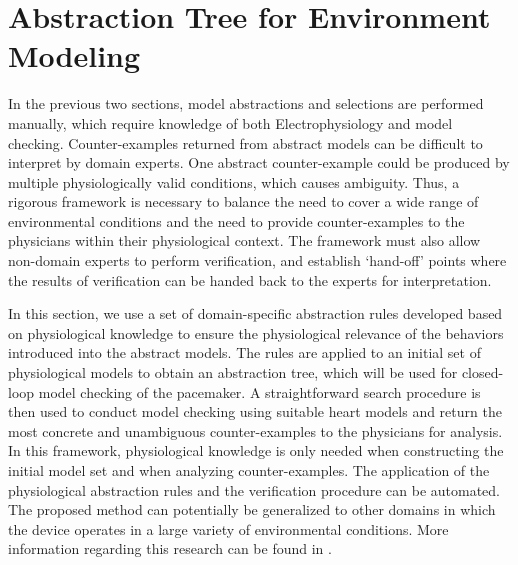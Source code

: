 \section{Abstraction Tree for Environment Modeling}
In the previous two sections, model abstractions and selections are performed manually, which require knowledge of both Electrophysiology and model checking. 
Counter-examples returned from abstract models can be difficult to interpret by domain experts.
One abstract counter-example could be produced by multiple physiologically valid conditions, which causes ambiguity.
Thus, a rigorous framework is necessary to balance the need to cover a wide range of environmental conditions and the need to provide counter-examples to the physicians within their physiological context. The framework must also allow non-domain experts to perform verification, and establish `hand-off' points where the results of verification can be handed back 
to the experts for interpretation.

In this section, we use a set of domain-specific abstraction rules developed based on physiological knowledge to ensure the physiological relevance of the behaviors introduced into the abstract models.
The rules are applied to an initial set of physiological models to obtain an abstraction tree, which will be used for closed-loop model checking of the pacemaker. 
A straightforward search procedure is then used to conduct model checking using suitable heart models and return the most concrete and unambiguous counter-examples to the physicians for analysis.
In this framework, physiological knowledge is only needed when constructing the initial model set and when analyzing counter-examples. 
The application of the physiological abstraction rules and the verification procedure can be automated.
The proposed method can potentially be generalized to other domains in which the device operates in a large variety of environmental conditions. More information regarding this research can be found in \cite{regar_tech}.
